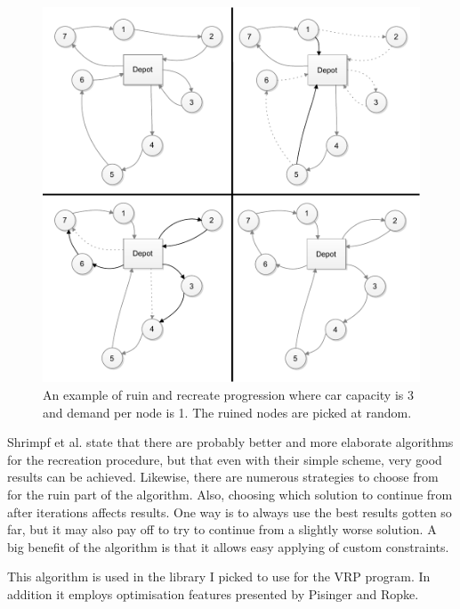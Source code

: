 \begin{figure}[H]
  \begin{center}
    \includegraphics[width=\textwidth]{images/ruinrecreate.pdf}
    \caption{An example of ruin and recreate progression where car capacity is 3 and demand per node is 1. The ruined nodes are picked at random.}
    \label{fig:ruinrecreate}
  \end{center}
\end{figure}

Shrimpf et al. state that there are probably better and more elaborate algorithms for the recreation procedure, but that even with their simple scheme, very good results can be achieved. Likewise, there are numerous strategies to choose from for the ruin part of the algorithm. Also, choosing which solution to continue from after iterations affects results. One way is to always use the best results gotten so far, but it may also pay off to try to continue from a slightly worse solution. A big benefit of the algorithm is that it allows easy applying of custom constraints. \cite{schrimpf2000record} 

This algorithm is used in the library I picked to use for the VRP program. In addition it employs optimisation features presented by Pisinger and Ropke\cite{pisinger2007general}.

